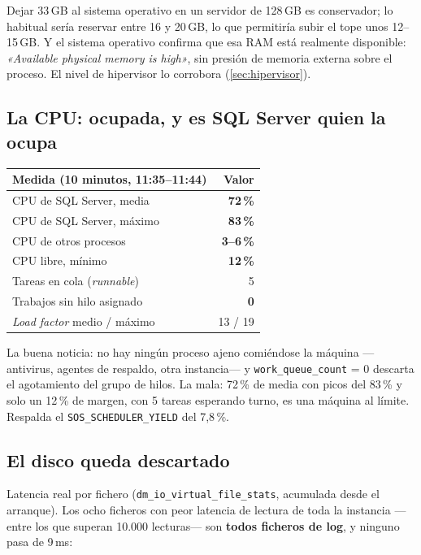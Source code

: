 \documentclass[11pt,a4paper]{article}
\newcommand{\cod}[1]{\texttt{\small #1}}
\newcommand{\critico}[1]{\textcolor{rojo}{\textbf{#1}}}
\newcommand{\bien}[1]{\textcolor{verde}{\textbf{#1}}}
\newcommand{\aviso}[1]{\textcolor{ambar}{\textbf{#1}}}
\begin{document}
Dejar 33\,GB al sistema operativo en un servidor de 128\,GB es conservador;
lo habitual sería reservar entre 16 y 20\,GB, lo que permitiría subir el tope
unos 12--15\,GB. Y el sistema operativo confirma que esa RAM está realmente
disponible: \emph{«Available physical memory is high»}, sin presión de
memoria externa sobre el proceso. El nivel de hipervisor lo corrobora
(\ref{sec:hipervisor}).

\subsection{La CPU: ocupada, y es SQL Server quien la ocupa}

\begin{table}[h]
\centering
\small
\begin{tabular}{lr}
\toprule
\textbf{Medida (10 minutos, 11:35--11:44)} & \textbf{Valor} \\
\midrule
CPU de SQL Server, media   & \aviso{72\,\%} \\
CPU de SQL Server, máximo  & \critico{83\,\%} \\
CPU de otros procesos      & \bien{3--6\,\%} \\
CPU libre, mínimo          & \critico{12\,\%} \\
Tareas en cola (\emph{runnable})  & 5 \\
Trabajos sin hilo asignado & \bien{0} \\
\emph{Load factor} medio / máximo & 13 / 19 \\
\bottomrule
\end{tabular}
\end{table}

La buena noticia: no hay ningún proceso ajeno comiéndose la máquina
—antivirus, agentes de respaldo, otra instancia— y \cod{work\_queue\_count} =
0 descarta el agotamiento del grupo de hilos. La mala: 72\,\% de media con
picos del 83\,\% y solo un 12\,\% de margen, con 5 tareas esperando turno,
es una máquina al límite. Respalda el \cod{SOS\_SCHEDULER\_YIELD} del
7,8\,\%.

\subsection{El disco queda descartado}

Latencia real por fichero (\cod{dm\_io\_virtual\_file\_stats}, acumulada
desde el arranque). Los ocho ficheros con peor latencia de lectura de toda la
instancia —entre los que superan 10.000 lecturas— son \textbf{todos ficheros
de log}, y ninguno pasa de 9\,ms:
\end{document}
